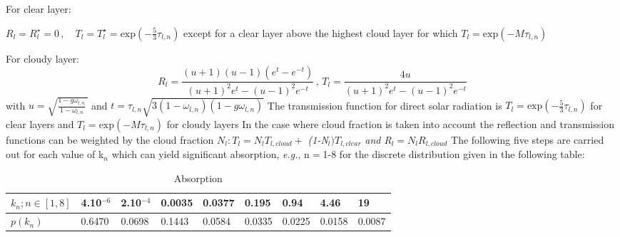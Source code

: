 For clear layer:

$R_{l}=R_{l}^{\star }=0\, ,
\quad
T_{l}=T_{l}^{\star }=\mathrm{exp}(-\frac{5}{3}\tau_{l,n})$ except for a
clear layer above the highest cloud layer for which
$T_{l}=\mathrm{exp}(-M\tau_{l,n})$

For cloudy layer:
\begin{equation}
R_{l}=\frac{(u+1)(u-1)\left( e^{t}-e^{-t} \right)}{\left( u+1
\right)^{2}e^{t}-\left( u-1 \right)^{2}e^{-t}}\, ,\, T_{l}=\frac{4u}{\left(
u+1 \right)^{2}e^{t}-\left( u-1 \right)^{2}e^{-t}}
\end{equation}
with
\newline
\newline
$u=\sqrt {\frac{1-g\omega_{l,n}}{1-\omega_{l,n}}\, } $ and $t=\tau
_{l,n}\sqrt {3(1-\omega_{l,n})(1-g\omega_{l,n})} $
\newline
The transmission function for direct solar radiation is
\newline
\newline
$T_{l}=\mathrm{exp}(-\frac{5}{3}\tau_{l,n})$ for clear layers and
\newline
$T_{l}=\mathrm{exp}(-M\tau_{l,n})$ for cloudy layers
\newline
\newline
In the case where cloud fraction is taken into account the reflection and
transmission functions can be weighted by the cloud fraction
\newline
\newline
 $N_{l} : T_{l}=N_{l} T_{l,cloud}+$\textit{ (1-N}$_{l})T_{l,clear}$\textit{ and R}$_{l}=N_{l}R_{l,cloud}$
\newline
\newline
The following five steps are carried out for each value of k$_{n}$ which can
yield significant absorption, \emph{e.g.}, n$=$1-8 for the discrete distribution
given in the following table:

\begin{table}[htbp]
\begin{center}
\caption[absorption]{Absorption}
\begin{tabular}{|p{76pt}|l|l|l|l|l|l|l|l|}

\hline

\hline

$k_{n};n\in \left[ 1,8 \right]$&
4.10$^{-6}$&
2.10$^{-4}$&
0.0035&
0.0377&
0.195&
0.94&
4.46&
19 \\
\hline
$p\left( k_{n} \right)$&
0.6470&
0.0698&
0.1443&
0.0584&
0.0335&
0.0225&
0.0158&
0.0087\\
\hline

\end{tabular}
\label{tab2}
\end{center}
\end{table}


